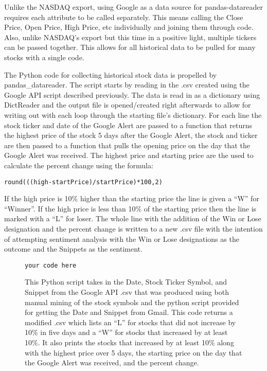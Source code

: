 \documentclass[sigconf]{acmart}
\begin{document}
Unlike the NASDAQ export, using Google as a data source for pandas-datareader requires each attribute to be called separately. This means calling the Close Price, Open Price, High Price, etc individually and joining them through code. Also, unlike NASDAQ's export but this time in a positive light, multiple tickers can be passed together. This allows for all historical data to be pulled for many stocks with a single code. 

The Python code for collecting historical stock data is propelled by pandas\_datareader. The script starts by reading in the .csv created using the Google API script described previously. The data is read in as a dictionary using DictReader and the output file is opened/created right afterwards to allow for writing out with each loop through the starting file's dictionary. For each line the stock ticker and date of the Google Alert are passed to a function that returns the highest price of the stock 5 days after the Google Alert, the stock and ticker are then passed to a function that pulls the opening price on the day that the Google Alert was received. The highest price and starting price are the used to calculate the percent change using the formula: 
\begin{mdframed}[style=default]
\begin{lstlisting}
round(((high-startPrice)/startPrice)*100,2)
\end{lstlisting}
\end{mdframed}
If the high price is 10\% higher than the starting price the line is given a ``W'' for ``Winner''. If the high price is less than 10\% of the starting price then the line is marked with a ``L'' for loser. The whole line with the addition of the Win or Lose  designation and the percent change is written to a new .csv file with the intention of attempting sentiment analysis with the Win or Lose designations as the outcome and the Snippets as the sentiment. 


\begin{figure}[htb]
\begin{verbatim}
your code here 
\end{verbatim}
\caption{This Python script takes in the Date, Stock Ticker Symbol, and Snippet from the Google API .csv that was produced using both manual mining of the stock symbols and the python script provided for getting the Date and Snippet from Gmail. This code returns a modified .csv which lists an ``L'' for stocks that did not increase by 10\% in five days and a ``W'' for stocks that increased by at least 10\%. It also prints the stocks that increased by at least 10\% along with the highest price over 5 days, the starting price on the day that the Google Alert was received, and the percent change.}\label{c:stock}
\end{figure}
\end{document}
